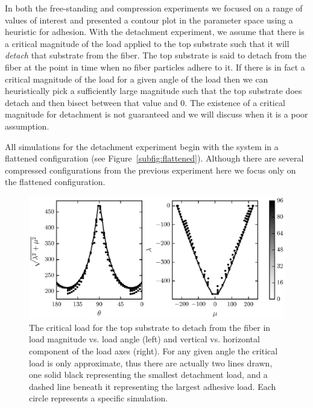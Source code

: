 In both the free-standing and compression experiments we focused on a range of values of interest and presented a contour plot in the parameter space using a heuristic for adhesion. With the detachment experiment,  we assume that there is a critical magnitude of the load applied to the top substrate such that it will \textit{detach} that substrate from the fiber. The top substrate is said to detach from the fiber at the point in time when no fiber particles adhere to it. If there is in fact a critical magnitude of the load for a given angle of the load then we can heuristically pick a sufficiently large magnitude such that the top substrate does detach and then bisect between that value and $0$. The existence of a critical magnitude for detachment is not guaranteed and we will discuss when it is a poor assumption.

All simulations for the detachment experiment begin with the system in a flattened configuration (see Figure~\ref{subfig:flattened}). Although there are several compressed configurations from the previous experiment here we focus only on the flattened configuration.
   
   \begin{figure}[t]
      \begin{center}
         \includegraphics{./fig/ch3/pull/ref/grid.eps}
      \end{center}      
      \caption{The critical load for the top substrate to detach from the fiber in load magnitude vs. load angle (left) and vertical vs. horizontal component of the load axes (right). For any given angle the critical load is only approximate, thus there are actually two lines drawn, one solid black representing the smallest detachment load, and a dashed line beneath it representing the largest adhesive load. Each circle represents a specific simulation.
      \label{fig:pull:ref}}
   \end{figure}

